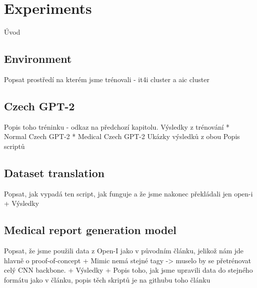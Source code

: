 \chapter{Experiments}
Úvod

\section{Environment}
Popsat prostředí na kterém jsme trénovali - it4i cluster a aic cluster

\section{Czech GPT-2}
Popis toho tréninku - odkaz na předchozí kapitolu.
Výsledky z trénování
* Normal Czech GPT-2
* Medical Czech GPT-2
Ukázky výsledků z obou
Popis scriptů

\section{Dataset translation}
Popsat, jak vypadá ten script, jak funguje a že jsme nakonec překládali jen open-i
+ Výsledky

\section{Medical report generation model}
Popsat, že jsme použili data z Open-I jako v původním článku, jelikož nám jde hlavně o proof-of-concept + Mimic nemá stejné tagy -> muselo by se přetrénovat celý CNN backbone.
+ Výsledky
+ Popis toho, jak jsme upravili data do stejného formátu jako v článku, popis těch skriptů je na githubu toho článku